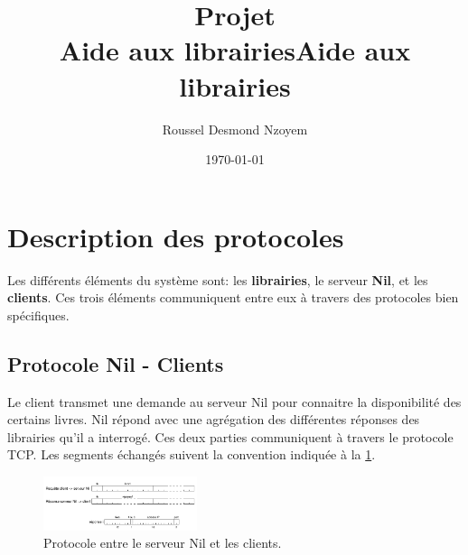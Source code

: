 \documentclass[
  french,
  twocolumn,
	9pt, %
]{fphw}
\title{Projet\\Aide aux librairies} %
\author{Roussel Desmond Nzoyem} %
\date{\today} %
\institute{Université de Strasbourg \\ UFR de Mathématiques et Informatique} %
\begin{document}


\renewcommand{\abstractname}{Introduction}

\title{Aide aux librairies} %

\section{Description des protocoles}

Les différents éléments du système sont: les \textbf{librairies}, le serveur \textbf{Nil}, et les \textbf{clients}. Ces trois éléments communiquent entre eux à travers des protocoles bien spécifiques.


\subsection{Protocole Nil - Clients}

Le client transmet une demande au serveur Nil pour connaitre la disponibilité des certains livres. Nil répond avec une agrégation des différentes réponses des librairies qu'il a interrogé. Ces deux parties communiquent à travers le protocole TCP. Les segments échangés suivent la convention indiquée à la \cref{fig:nil-client}.
\begin{figure}[H]
	\centering
	\includegraphics[width=0.4\textwidth]{nil-client.png}
	\caption{Protocole entre le serveur Nil et les clients.}
	\label{fig:nil-client}
\end{figure}
\end{document}
